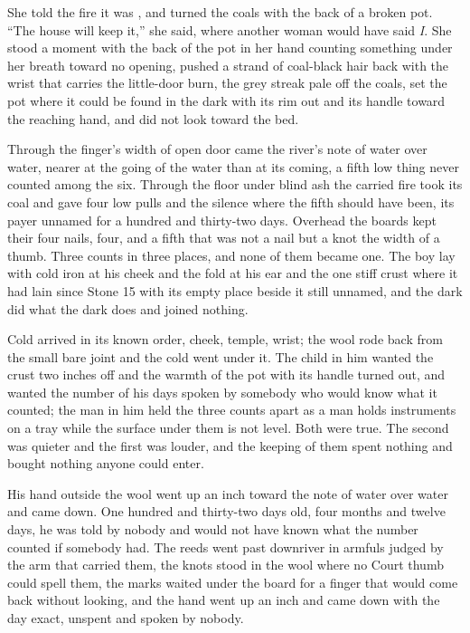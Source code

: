She told the fire it was , and turned the coals with the back of a broken pot. “The house will keep it,” she said, where another woman would have said \emph{I}. She stood a moment with the back of the pot in her hand counting something under her breath toward no opening, pushed a strand of coal-black hair back with the wrist that carries the little-door burn, the grey streak pale off the coals, set the pot where it could be found in the dark with its rim out and its handle toward the reaching hand, and did not look toward the bed.

Through the finger's width of open door came the river's note of water over water, nearer at the going of the water than at its coming, a fifth low thing never counted among the six. Through the floor under blind ash the carried fire took its coal and gave four low pulls and the silence where the fifth should have been, its payer unnamed for a hundred and thirty-two days. Overhead the boards kept their four nails, four, and a fifth that was not a nail but a knot the width of a thumb. Three counts in three places, and none of them became one. The boy lay with cold iron at his cheek and the fold at his ear and the one stiff crust where it had lain since Stone 15 with its empty place beside it still unnamed, and the dark did what the dark does and joined nothing.

Cold arrived in its known order, cheek, temple, wrist; the wool rode back from the small bare joint and the cold went under it. The child in him wanted the crust two inches off and the warmth of the pot with its handle turned out, and wanted the number of his days spoken by somebody who would know what it counted; the man in him held the three counts apart as a man holds instruments on a tray while the surface under them is not level. Both were true. The second was quieter and the first was louder, and the keeping of them spent nothing and bought nothing anyone could enter.

His hand outside the wool went up an inch toward the note of water over water and came down. One hundred and thirty-two days old, four months and twelve days, he was told by nobody and would not have known what the number counted if somebody had. The reeds went past downriver in armfuls judged by the arm that carried them, the knots stood in the wool where no Court thumb could spell them, the marks waited under the board for a finger that would come back without looking, and the hand went up an inch and came down with the day exact, unspent and spoken by nobody.

